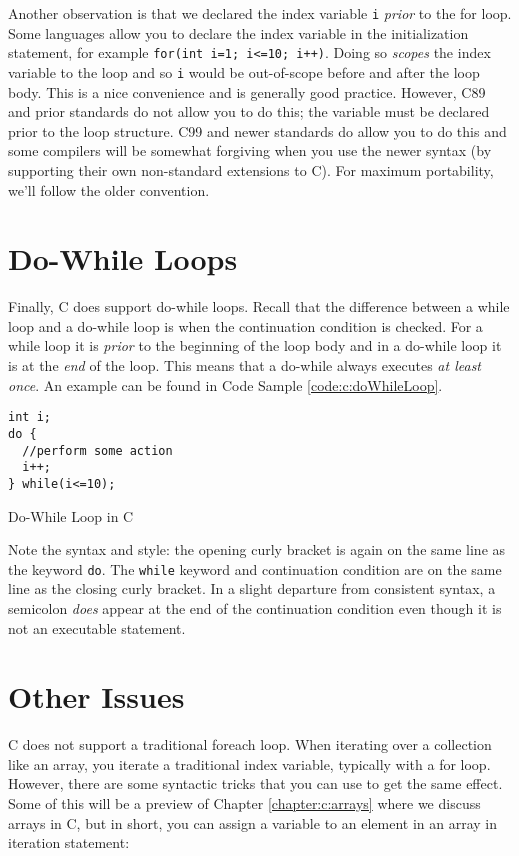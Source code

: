 Another observation is that we declared the index variable \texttt{i} 
\emph{prior} to the for loop.  Some languages allow you to declare the index
variable in the initialization statement, for example \texttt{for(int i=1; i<=10; i++)}.
Doing so \emph{scopes} the index variable to the loop and so \texttt{i}
would be out-of-scope before and after the loop body.  This is a nice convenience
and is generally good practice.  However, C89 and prior standards do not allow you
to do this; the variable must be declared prior to the loop structure.  C99 and 
newer standards do allow you to do this and some compilers will be somewhat
forgiving when you use the newer syntax (by supporting their own non-standard
extensions to C).  For maximum portability, we'll follow the older convention.

\section{Do-While Loops}

Finally, C does support do-while loops.  Recall that the difference between a
while loop and a do-while loop is when the continuation condition is checked.
For a while loop it is \emph{prior} to the beginning of the loop body and in
a do-while loop it is at the \emph{end} of the loop.  This means that a do-while 
always executes \emph{at least once}.  An example can be found in Code
Sample \ref{code:c:doWhileLoop}.

\begin{listing}
\begin{verbatim}
int i;
do {
  //perform some action
  i++;
} while(i<=10);
\end{verbatim}
  \caption{Do-While Loop in C}
  \label{code:c:doWhileLoop}
\end{listing}

Note the syntax and style: the opening curly bracket is again on the same
line as the keyword \texttt{do}.  The \texttt{while} keyword and
continuation condition are on the same line as the closing curly bracket.
In a slight departure from consistent syntax, a semicolon \emph{does} appear
at the end of the continuation condition even though it is not an
executable statement.

\section{Other Issues}

C does not support a traditional foreach loop.  When iterating over a
collection like an array, you iterate a traditional index variable, typically
with a for loop.  However, there are some syntactic tricks that you can
use to get the same effect.  Some of this will be a preview of Chapter
\ref{chapter:c:arrays} where we discuss arrays in C, but in short, you can
assign a variable to an element in an array in iteration statement:


